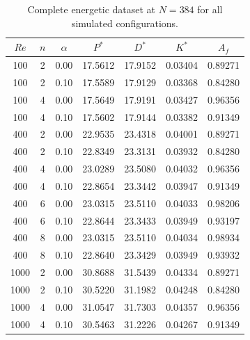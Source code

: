\begin{table}[h]
\centering
\caption{Complete energetic dataset at $N=384$ for all simulated configurations.}
\label{tab:full_scalars384}
\begin{tabular}{@{}ccccccc@{}}
\hline
$Re$ & $n$ & $\alpha$ & $P^*$ & $D^*$ & $K^*$ & $A_f$ \\
\hline
100 & 2 & 0.00 & 17.5612 & 17.9152 & 0.03404 & 0.89271 \\
100 & 2 & 0.10 & 17.5589 & 17.9129 & 0.03368 & 0.84280 \\
100 & 4 & 0.00 & 17.5649 & 17.9191 & 0.03427 & 0.96356 \\
100 & 4 & 0.10 & 17.5602 & 17.9144 & 0.03382 & 0.91349 \\
400 & 2 & 0.00 & 22.9535 & 23.4318 & 0.04001 & 0.89271 \\
400 & 2 & 0.10 & 22.8349 & 23.3131 & 0.03932 & 0.84280 \\
400 & 4 & 0.00 & 23.0289 & 23.5080 & 0.04032 & 0.96356 \\
400 & 4 & 0.10 & 22.8654 & 23.3442 & 0.03947 & 0.91349 \\
400 & 6 & 0.00 & 23.0315 & 23.5110 & 0.04033 & 0.98206 \\
400 & 6 & 0.10 & 22.8644 & 23.3433 & 0.03949 & 0.93197 \\
400 & 8 & 0.00 & 23.0315 & 23.5110 & 0.04034 & 0.98934 \\
400 & 8 & 0.10 & 22.8640 & 23.3429 & 0.03949 & 0.93932 \\
1000 & 2 & 0.00 & 30.8688 & 31.5439 & 0.04334 & 0.89271 \\
1000 & 2 & 0.10 & 30.5220 & 31.1982 & 0.04248 & 0.84280 \\
1000 & 4 & 0.00 & 31.0547 & 31.7303 & 0.04357 & 0.96356 \\
1000 & 4 & 0.10 & 30.5463 & 31.2226 & 0.04267 & 0.91349 \\
\hline
\end{tabular}
\end{table}